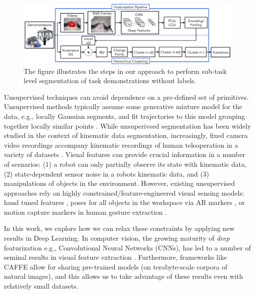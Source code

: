 \begin{figure}[!t]
\centering
\includegraphics[width=0.9\linewidth]{figures/sysArch}
\caption{The figure illustrates the steps in our approach to perform sub-task level segmentation of task demonstrations without labels.}
\label{fig:pipeline}
\vspace{-15pt}
\end{figure}

Unsupervised techniques can avoid dependence on a pre-defined set of primitives.
Unsupervised methods typically assume some generative mixture model for the data, e.g., locally Gaussian segments, and fit trajectories to this model grouping together locally similar points \cite{calinon2010learning, krishnan2015tsc, calinon2004stochastic, kruger2010learning, fox2009nonparametric, oh2005learning}.
While unsuperivsed segmentation has been widely studied in the context of kinematic data segmentation, increasingly, fixed camera video recordings accompany kinematic recordings of human teleoperation in a variety of datasets \cite{hodgins2009guide, gao2014jigsaws, ofli2013berkeley}.
Visual features can provide crucial information in a number of scenarios: (1) a robot can only partially observe its state with kinematic data, (2) state-dependent sensor noise in a robots kinematic data, and (3) manipulations of objects in the environment.
However, existing unsupervised approaches rely on highly constrained/feature-engineered visual sensing models: hand tuned features \cite{krishnan2015tsc}, poses for all objects in the workspace via AR markers \cite{Niekum2015learning}, or motion capture markers in human gesture extraction \cite{kulic2011incremental}.



In this work, we explore how we can relax these constraints by applying new results in Deep Learning.
In computer vision, the growing maturity of \emph{deep} featurization e.g., Convolutional Neural Networks (CNNs), has led to a number of seminal results in visual feature extraction \cite{krizhevsky2012imagenet, lecun1995convolutional, jia2014caffe, long2014fully}.
Furthermore, frameworks like CAFFE \cite{jia2014caffe} allow for sharing pre-trained models (on terabyte-scale corpora of natural images), and this allows us to take advantage of these results even with relatively small datasets.

